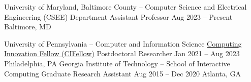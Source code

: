 {\color{black}\fontsize{12pt}{1em}} 


\begin{cventries}


  \cventry
    {University of Maryland, Baltimore County -- Computer Science and Electrical Engineering (CSEE) Department} %
    {Assistant Professor} %
    {Aug 2023 – Present} %
    {Baltimore, MD} %
    {
    }

  \cventry
    {University of Pennsylvania -- Computer and Information Science} %
    {\href{https://cifellows2020.org/}{Computing Innovation Fellow (CIFellow)} Postdoctoral Researcher} %
    {Jan 2021 – Aug 2023} %
    {Philadelphia, PA} %
    {
    }
  \cventry
    {Georgia Institute of Technology -- School of Interactive Computing} %
    {Graduate Research Assistant} %
    {Aug 2015 – Dec 2020} %
    {Atlanta, GA} %
    {
    }


\end{cventries}
